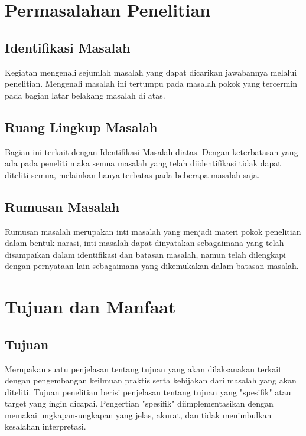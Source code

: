 \section{Permasalahan Penelitian}

\subsection{Identifikasi Masalah}
\begin{subsectioncontent}
    \hspace{\parindent}Kegiatan mengenali sejumlah masalah yang dapat dicarikan jawabannya melalui penelitian. Mengenali masalah ini tertumpu pada masalah pokok yang tercermin pada bagian latar belakang masalah di atas.
\end{subsectioncontent}

\subsection{Ruang Lingkup Masalah}
\begin{subsectioncontent}
    \hspace{\parindent}Bagian ini terkait dengan Identifikasi Masalah diatas. Dengan keterbatasan yang ada pada peneliti maka semua masalah yang telah diidentifikasi tidak dapat diteliti semua, melainkan hanya terbatas pada beberapa masalah saja.
\end{subsectioncontent}

\subsection{Rumusan Masalah}
\begin{subsectioncontent}
    \hspace{\parindent}Rumusan masalah merupakan inti masalah yang menjadi materi pokok penelitian dalam bentuk narasi, inti masalah dapat dinyatakan sebagaimana yang telah disampaikan dalam identifikasi dan batasan masalah, namun telah dilengkapi dengan pernyataan lain sebagaimana yang dikemukakan dalam  batasan masalah.
\end{subsectioncontent}

\section{Tujuan dan Manfaat}

\subsection{Tujuan}
\begin{subsectioncontent}
    \hspace{\parindent}Merupakan suatu penjelasan tentang tujuan yang akan dilaksanakan terkait dengan pengembangan keilmuan praktis serta kebijakan dari masalah yang akan diteliti. Tujuan penelitian berisi penjelasan tentang tujuan yang "spesifik" atau target yang ingin dicapai. Pengertian "spesifik" diimplementasikan dengan memakai ungkapan-ungkapan yang jelas, akurat, dan tidak menimbulkan kesalahan interpretasi.
\end{subsectioncontent}

